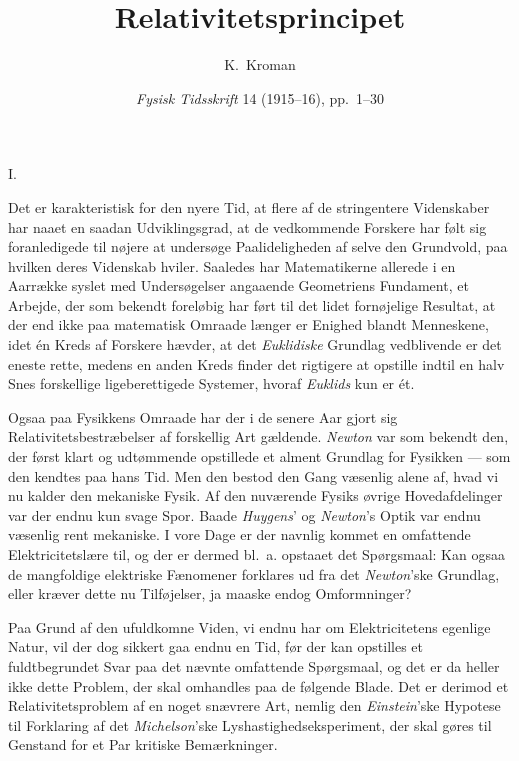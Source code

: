 \documentclass[12pt,a4paper]{article}
\title{\textbf{\guillemotleft Relativitetsprincipet\guillemotright}}
\author{K.\ Kroman}
\date{\textit{Fysisk Tidsskrift} 14 (1915--16), pp.~1--30}
\newcommand{\opage}[1]{\marginnote{\footnotesize\textit{[#1]}}}
\begin{document}
\maketitle

\opage{1} \begin{center}
I.
\end{center}

Det er karakteristisk for den nyere Tid, at flere af de stringentere
Videnskaber har naaet en saadan Udviklingsgrad, at de vedkommende Forskere
har følt sig foranledigede til nøjere at undersøge Paalideligheden af selve
den Grundvold, paa hvilken deres Videnskab hviler. Saaledes har Matematikerne
allerede i en Aarrække syslet med Undersøgelser angaaende Geometriens
Fundament, et Arbejde, der som bekendt foreløbig har ført til det lidet
fornøjelige Resultat, at der end ikke paa matematisk Omraade længer er Enighed
blandt Menneskene, idet én Kreds af Forskere hævder, at det \emph{Euklidiske}
Grundlag vedblivende er det eneste rette, medens en anden Kreds finder det
rigtigere at opstille indtil en halv Snes forskellige ligeberettigede
Systemer, hvoraf \emph{Euklids} kun er ét.

Ogsaa paa Fysikkens Omraade har der i de senere Aar gjort sig
Relativitetsbestræbelser af forskellig Art gældende. \emph{Newton} var som
bekendt den, der først klart og udtømmende opstillede et alment Grundlag for
Fysikken --- som den kendtes paa hans Tid. Men den bestod den Gang væsenlig
alene af, hvad vi nu kalder den mekaniske Fysik. Af den nuværende Fysiks
øvrige Hovedafdelinger var der endnu kun svage Spor. Baade \emph{Huygens}' og
\emph{Newton}'s Optik var endnu væsenlig rent mekaniske. I vore Dage er der
navnlig kommet en omfattende Elektricitetslære til, og der er dermed bl.\ a.
opstaaet det Spørgsmaal: Kan ogsaa de mangfoldige elektriske Fænomener
forklares ud fra det \emph{Newton}'ske Grundlag, eller kræver dette nu
Tilføjelser, ja maaske endog Omformninger?

\opage{2} Paa Grund af den ufuldkomne Viden, vi endnu har om Elektricitetens egenlige
Natur, vil der dog sikkert gaa endnu en Tid, før der kan opstilles et
fuldtbegrundet Svar paa det nævnte omfattende Spørgsmaal, og det er da heller
ikke dette Problem, der skal omhandles paa de følgende Blade. Det er derimod
et Relativitetsproblem af en noget snævrere Art, nemlig den
\emph{Einstein}'ske Hypotese til Forklaring af det \emph{Michelson}'ske
Lyshastighedseksperiment, der skal gøres til Genstand for et Par kritiske
Bemærkninger.
\end{document}
